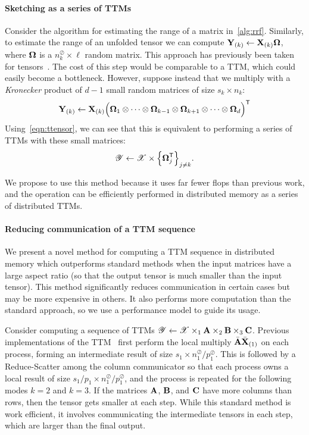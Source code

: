 \paragraph{Sketching as a series of TTMs}
Consider the algorithm for estimating the range of a matrix in~\cref{alg:rrf}. 
Similarly, to estimate the range of an unfolded tensor we can compute
$\M{Y}_{(k)} \gets \M{X}_{(k)} \M{\Omega}$, where $\M{\Omega}$ 
is a $n_k^\oslash \times \ell$ random matrix. This approach has previously been taken for tensors~\cite{bigtens,DBLP:conf/acssc/VervlietDL16,Navasca2015}. The cost of this step would be 
comparable to a TTM, which could easily become a bottleneck.
However, suppose instead that we multiply with a \emph{Kronecker} product of $d-1$ small random matrices of size $s_k \times n_k$:
\begin{equation}
  \label{eqn:sketchasgemm}
  \M{Y}_{(k)} \gets \M{X}_{(k)} \Big( \M{\Omega}_1 \otimes \cdots \otimes \M{\Omega}_{k-1} \otimes \M{\Omega}_{k+1} \otimes \dots \otimes \M{\Omega}_d \Big)^\trans
\end{equation}
Using~\cref{eqn:ttensor}, we can see that this is equivalent
to performing a series of TTMs with these small matrices:
\begin{equation}
  \label{eqn:sketchasttm}
  \T{Y} \gets \T{X} \times \Big\{ \M{\Omega}_j^\trans \Big\}_{j \neq k}.
\end{equation}

We propose to use this method because it uses far fewer flops than previous work, and the operation can be efficiently performed in distributed memory as a series of distributed TTMs. 

\paragraph{Reducing communication of a TTM sequence}
We present a novel method for computing a TTM sequence in distributed memory which outperforms standard methods when the input matrices have a large aspect ratio (so that the output tensor is much smaller than the input tensor). 
This method significantly reduces communication in certain cases but may be more expensive in others.
It also performs more computation than the standard approach, so we use a performance model to guide its usage.

Consider computing a sequence of TTMs $\T{Y} \gets \T{X} \times_1 \M{A} \times_2 \M{B} \times_3 \M{C}$. Previous implementations of the TTM~\cite{AuBaKo16} first perform the local multiply $\bar{\M{A}}\bar{\M{X}}_{(1)}$ on each process, forming an intermediate result of size $s_1 \times n_1^\oslash / p_1^\oslash$. This is followed by a Reduce-Scatter among the column communicator so that each process owns a local result of size $s_1/p_1 \times n_1^\oslash / p_1^\oslash$, and the process is repeated for the following modes $k=2$ and $k=3$. 
If the matrices $\M{A}$, $\M{B}$, and $\M{C}$ have more columns than rows, then the tensor gets smaller at each step.
While this standard method is work efficient, it involves communicating the intermediate tensors in each step, which are larger than the final output.

